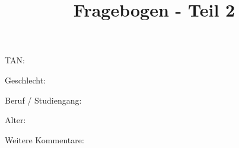 \documentclass[10pt,a4paper]{scrartcl}
\title{Fragebogen - Teil 2}
\date{\vspace{-5ex}}
\begin{document}
\maketitle
\pagestyle{empty}

\vspace{2 cm}

TAN: \dotfill\\

\vspace{2 cm}

Geschlecht: \dotfill\\

\vspace{2 cm}

Beruf / Studiengang: \dotfill\\

\vspace{2 cm}

Alter: \dotfill\\

\vspace{2 cm}

Weitere Kommentare: \dotfill\\
\end{document}
